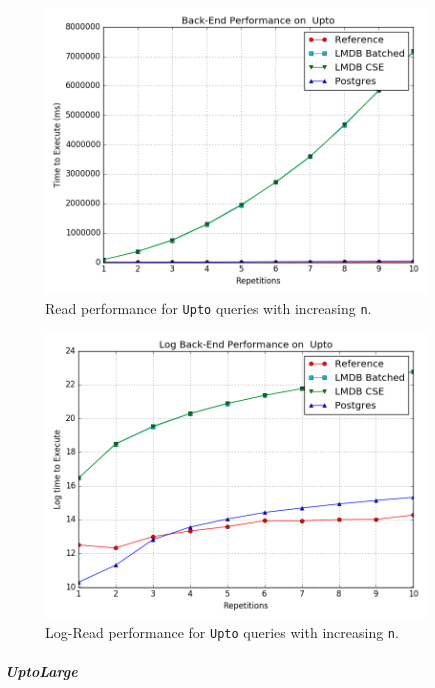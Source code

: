 \documentclass[12pt,a4paper,twoside,openright]{report}
\newcommand\codeName[1]{\texttt{#1}}
\let\oldsubparagraph\subparagraph
\renewcommand{\subparagraph}[1]{\oldsubparagraph{#1}\mbox{}}
\begin{document}
 \begin{figure}[ht]
\centering
  \includegraphics[width=0.9\textwidth]{scripts/UptoTrend.png}
  \caption{Read performance for \codeName{Upto} queries with increasing \codeName{n}.}
  \label{fig:UptoTrend}
\end{figure}

 \begin{figure}[ht]
\centering
  \includegraphics[width=0.9\textwidth]{scripts/UptoLogTrend.png}
  \caption{Log-Read performance for \codeName{Upto} queries with increasing \codeName{n}.}
  \label{fig:UptoLogTrend}
\end{figure}
			\subparagraph{UptoLarge}
			
\end{document}
